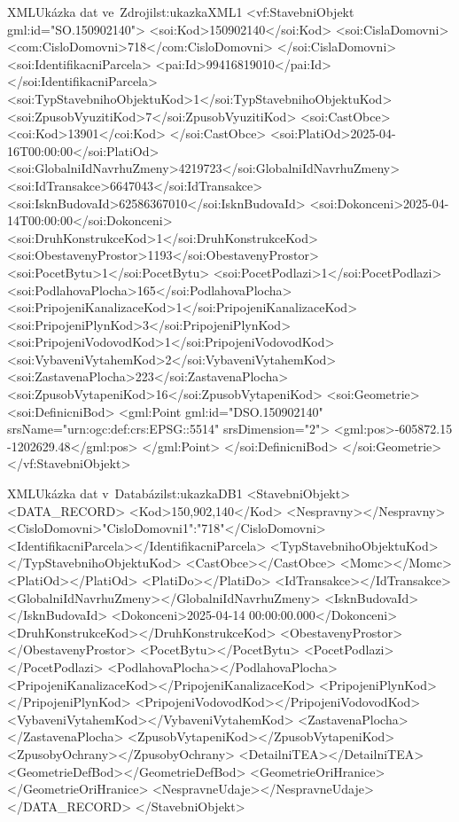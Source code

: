 \begin{code}{XML}{Ukázka dat ve~Zdroji}{lst:ukazkaXML1}
  <vf:StavebniObjekt gml:id="SO.150902140">
    <soi:Kod>150902140</soi:Kod>
    <soi:CislaDomovni>
      <com:CisloDomovni>718</com:CisloDomovni>
    </soi:CislaDomovni>
    <soi:IdentifikacniParcela>
      <pai:Id>99416819010</pai:Id>
    </soi:IdentifikacniParcela>
    <soi:TypStavebnihoObjektuKod>1</soi:TypStavebnihoObjektuKod>
    <soi:ZpusobVyuzitiKod>7</soi:ZpusobVyuzitiKod>
    <soi:CastObce>
      <coi:Kod>13901</coi:Kod>
    </soi:CastObce>
    <soi:PlatiOd>2025-04-16T00:00:00</soi:PlatiOd>
    <soi:GlobalniIdNavrhuZmeny>4219723</soi:GlobalniIdNavrhuZmeny>
    <soi:IdTransakce>6647043</soi:IdTransakce>
    <soi:IsknBudovaId>62586367010</soi:IsknBudovaId>
    <soi:Dokonceni>2025-04-14T00:00:00</soi:Dokonceni>
    <soi:DruhKonstrukceKod>1</soi:DruhKonstrukceKod>
    <soi:ObestavenyProstor>1193</soi:ObestavenyProstor>
    <soi:PocetBytu>1</soi:PocetBytu>
    <soi:PocetPodlazi>1</soi:PocetPodlazi>
    <soi:PodlahovaPlocha>165</soi:PodlahovaPlocha>
    <soi:PripojeniKanalizaceKod>1</soi:PripojeniKanalizaceKod>
    <soi:PripojeniPlynKod>3</soi:PripojeniPlynKod>
    <soi:PripojeniVodovodKod>1</soi:PripojeniVodovodKod>
    <soi:VybaveniVytahemKod>2</soi:VybaveniVytahemKod>
    <soi:ZastavenaPlocha>223</soi:ZastavenaPlocha>
    <soi:ZpusobVytapeniKod>16</soi:ZpusobVytapeniKod>
    <soi:Geometrie>
      <soi:DefinicniBod>
        <gml:Point gml:id="DSO.150902140" srsName="urn:ogc:def:crs:EPSG::5514" srsDimension="2">
          <gml:pos>-605872.15 -1202629.48</gml:pos>
        </gml:Point>
      </soi:DefinicniBod>
    </soi:Geometrie>
  </vf:StavebniObjekt>
\end{code}

\newpage

\begin{code}{XML}{Ukázka dat v~Databázi}{lst:ukazkaDB1}
  <StavebniObjekt>
    <DATA_RECORD>
      <Kod>150,902,140</Kod>
      <Nespravny></Nespravny>
      <CisloDomovni>{"CisloDomovni1":"718"}</CisloDomovni>
      <IdentifikacniParcela></IdentifikacniParcela>
      <TypStavebnihoObjektuKod></TypStavebnihoObjektuKod>
      <CastObce></CastObce>
      <Momc></Momc>
      <PlatiOd></PlatiOd>
      <PlatiDo></PlatiDo>
      <IdTransakce></IdTransakce>
      <GlobalniIdNavrhuZmeny></GlobalniIdNavrhuZmeny>
      <IsknBudovaId></IsknBudovaId>
      <Dokonceni>2025-04-14 00:00:00.000</Dokonceni>
      <DruhKonstrukceKod></DruhKonstrukceKod>
      <ObestavenyProstor></ObestavenyProstor>
      <PocetBytu></PocetBytu>
      <PocetPodlazi></PocetPodlazi>
      <PodlahovaPlocha></PodlahovaPlocha>
      <PripojeniKanalizaceKod></PripojeniKanalizaceKod>
      <PripojeniPlynKod></PripojeniPlynKod>
      <PripojeniVodovodKod></PripojeniVodovodKod>
      <VybaveniVytahemKod></VybaveniVytahemKod>
      <ZastavenaPlocha></ZastavenaPlocha>
      <ZpusobVytapeniKod></ZpusobVytapeniKod>
      <ZpusobyOchrany></ZpusobyOchrany>
      <DetailniTEA></DetailniTEA>
      <GeometrieDefBod></GeometrieDefBod>
      <GeometrieOriHranice></GeometrieOriHranice>
      <NespravneUdaje></NespravneUdaje>
    </DATA_RECORD>
  </StavebniObjekt>
\end{code}
